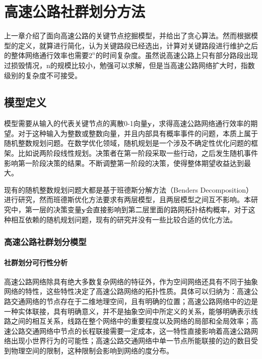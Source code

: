 
\chapter{高速公路社群划分方法}

	上一章介绍了面向高速公路的关键节点挖掘模型，并给出了贪心算法。然而根据模型的定义，就算进行简化，认为关键路段已经选出，计算对关键路段进行维护之后的整体网络通行效率也需要$2^n$的时间复杂度。虽然说高速公路上只有部分路段出现过损毁情况，n的规模比较小，勉强可以求解，但是当高速公路网络扩大时，指数级别的复杂度不可接受。

	\section{模型定义}
		模型需要从输入的代表关键节点的离散0-1向量$\bm{y}$，求得高速公路网络通行效率的期望。对于这种输入为整数或整数向量，并且内部具有概率事件的问题，本质上属于随机整数规划问题。在数学优化领域，随机规划是一个涉及不确定性优化问题的框架。比如说两阶段线性规划。决策者在第一阶段采取一些行动，之后发生随机事件影响第一阶段决策的结果。不断调整第一阶段的决策，使得整体期望收益达到最大。

		现有的随机整数规划问题大都是基于班德斯分解方法（Benders Decomposition）进行研究，然而班德斯优化方法要求有两层模型，且两层模型之间互不影响。本研究中，第一层的决策变量$\bm{y}$会直接影响到第二层里面的路网拓扑结构概率，对于这种相互依赖的随机规划问题，现有的研究并没有一些比较合适的优化方法。

		\subsection{高速公路社群划分模型}

			\subsubsection{社群划分可行性分析}

			高速公路网络除具有绝大多数复杂网络的特征外，作为空间网络还具有不同于抽象网络的特性，这些特性决定了高速公路网络的拓扑性质。具体可以归纳为：高速公路交通网络的节点存在于二维地理空间，且有明确的位置；高速公路网络中的边是一种实体联接，具有明确意义，并不是抽象空间中所定义的关系，能够明确表示线路之间的相互关系，线路在整个网络中的重要程度以及网络的局部和全局效率；高速公路交通网络中节点的长程联接需要一定成本，这一特性直接影响着高速公路网络出现小世界行为的可能性；高速公路交通网络中单一节点所能联接的边的数目受到物理空间的限制，这种限制会影响到网络的度分布。

